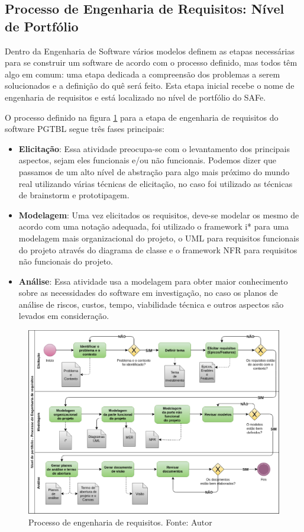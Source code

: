 \subsection{Processo de Engenharia de Requisitos: Nível de Portfólio}

Dentro da Engenharia de Software vários modelos definem as etapas necessárias para se construir um software de acordo
com o processo definido, mas todos têm algo em comum: uma etapa dedicada a compreensão dos problemas a serem
solucionados e a definição do quê será feito. Esta etapa inicial recebe o nome de engenharia de requisitos e está
localizado no nível de portfólio do SAFe.

O processo definido na figura \ref{fig:requisitos} para a etapa de engenharia de requisitos do software PGTBL segue três fases principais:

\begin{itemize}
  \item \textbf{Elicitação}: Essa atividade preocupa-se com o levantamento dos principais aspectos, sejam eles funcionais e/ou não funcionais. Podemos dizer que passamos de um alto nível de abstração para algo mais próximo do mundo real utilizando várias técnicas de elicitação, no caso foi utilizado as técnicas de brainstorm e prototipagem.
  \item \textbf{Modelagem}: Uma vez elicitados os requisitos, deve-se modelar os mesmo de acordo com uma notação adequada, foi utilizado o framework i* para uma modelagem mais organizacional do projeto, o UML para requisitos funcionais do projeto através do diagrama de classe e o framework NFR para requisitos não funcionais do projeto.
  \item \textbf{Análise}: Essa atividade usa a modelagem para obter maior conhecimento sobre as necessidades do software em investigação, no caso os planos de análise de riscos, custos, tempo, viabilidade técnica e outros aspectos são levados em consideração.
\end{itemize}

\begin{figure}[h!]
	\centering
  \includegraphics[keepaspectratio=true,scale=0.5]{figuras/requisitos.eps}
  \caption[Processo de engenharia de requisitos.]{Processo de engenharia de requisitos. Fonte: Autor}
	\label{fig:requisitos}
\end{figure}

